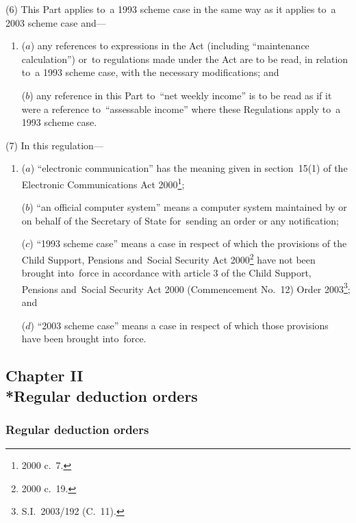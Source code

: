 \documentclass[12pt,a4paper]{article}
\begin{document}
(6) This Part applies to~a 1993 scheme case in the same way as it applies to~a 2003 scheme case and—
\begin{enumerate}\item[]
($a$) any references to expressions in the Act (including “maintenance calculation”) or~to regulations made under the Act are to be read, in relation to~a 1993 scheme case, with the necessary modifications; and

($b$) any reference in this Part to~“net weekly income” is to be read as if it were a reference to~“assessable income” where these Regulations apply to~a 1993 scheme case.
\end{enumerate}

(7) In this regulation—
\begin{enumerate}\item[]
($a$) “electronic communication” has the meaning given in section~15(1) of the Electronic Communications Act 2000\footnote{2000 c.~7.};

($b$) “an official computer system” means a computer system maintained by or on behalf of the 
Secretary of State  %
for~sending an order or any notification;

($c$) “1993 scheme case” means a case in respect of which the provisions of the Child Support, Pensions and~Social Security Act 2000\footnote{2000 c.~19.} have not been brought into~force in accordance with article 3 of the Child Support, Pensions and~Social Security Act 2000 (Commencement No.~12) Order 2003\footnote{S.I.~2003/192 (C.~11).}; and

($d$) “2003 scheme case” means a case in respect of which those provisions have been brought into~force.
\end{enumerate}


\subsection[Chapter II --- Regular deduction orders]{Chapter II\\*Regular deduction orders}

\renewcommand\parthead{--- Part IIIA Chapter II}

\subsubsection[25B. Regular deduction orders]{Regular deduction orders}
\end{document}

